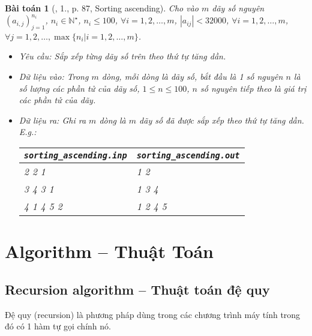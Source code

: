 \documentclass{article}
\newtheorem{baitoan}{Bài toán}
\begin{document}
\begin{baitoan}[\cite{VietSTEM2021}, 1., p. 87, Sorting ascending]
	Cho vào $m$ dãy số nguyên $(a_{i,j})_{j=1}^{n_i}$, $n_i\in\mathbb{N}^\star$, $n_i\le100$, $\forall i = 1,2,\ldots,m$, $|a_{ij}| < 32000$, $\forall i = 1,2,\ldots,m$, $\forall j = 1,2,\ldots,\max\{n_i|i = 1,2,\ldots,m\}$.
	\begin{itemize}
		\item {\sf Yêu cầu:} Sắp xếp từng dãy số trên theo thứ tự tăng dần.
		\item {\sf Dữ liệu vào:} Trong $m$ dòng, mỗi dòng là dãy số, bắt đầu là 1 số nguyên $n$ là số lượng các phần tử của dãy số, $1\le n\le100$, $n$ số nguyên tiếp theo là giá trị các phần tử của dãy.
		\item {\sf Dữ liệu ra:} Ghi ra $m$ dòng là $m$ dãy số đã được sắp xếp theo thứ tự tăng dần. E.g.:
		\begin{table}[H]
			\centering
			\begin{tabular}{|l|l|}
				\hline
				\verb|sorting_ascending.inp| & \verb|sorting_ascending.out| \\
				\hline
				2 2 1  & 1 2 \\
				3 4 3 1 & 1 3 4 \\
				4 1 4 5 2 & 1 2 4 5 \\
				\hline
			\end{tabular}
		\end{table}
	\end{itemize}
\end{baitoan}


\section{Algorithm -- Thuật Toán}

\subsection{Recursion algorithm -- Thuật toán đệ quy}
Đệ quy (recursion) là phương pháp dùng trong các chương trình máy tính trong đó có 1 hàm tự gọi chính nó.
\end{document}
